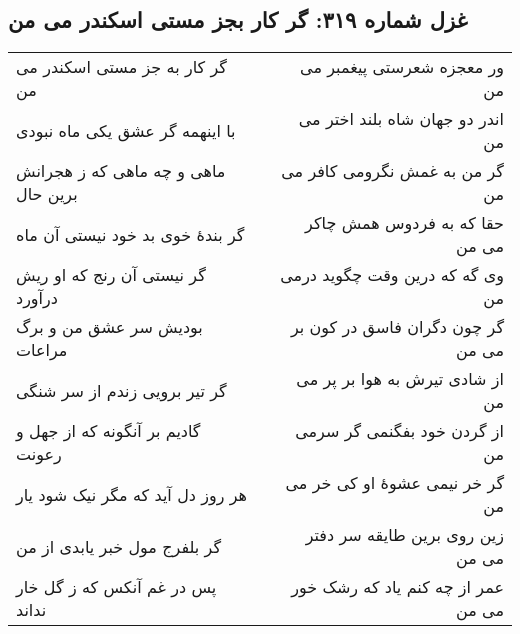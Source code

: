 \begin{center}
\section*{غزل شماره ۳۱۹: گر کار بجز مستی اسکندر می من}
\label{sec:319}
\begin{longtable}{l p{0.5cm} r}
گر کار به جز مستی اسکندر می من
&&
ور معجزه شعرستی پیغمبر می من
\\
با اینهمه گر عشق یکی ماه نبودی
&&
اندر دو جهان شاه بلند اختر می من
\\
ماهی و چه ماهی که ز هجرانش برین حال
&&
گر من به غمش نگرومی کافر می من
\\
گر بندهٔ خوی بد خود نیستی آن ماه
&&
حقا که به فردوس همش چاکر می من
\\
گر نیستی آن رنج که او ریش درآورد
&&
وی گه که درین وقت چگوید درمی من
\\
بودیش سر عشق من و برگ مراعات
&&
گر چون دگران فاسق در کون بر می من
\\
گر تیر برویی زندم از سر شنگی
&&
از شادی تیرش به هوا بر پر می من
\\
گادیم بر آنگونه که از جهل و رعونت
&&
از گردن خود بفگنمی گر سرمی من
\\
هر روز دل آید که مگر نیک شود یار
&&
گر خر نیمی عشوهٔ او کی خر می من
\\
گر بلفرج مول خبر یابدی از من
&&
زین روی برین طایقه سر دفتر می من
\\
پس در غم آنکس که ز گل خار نداند
&&
عمر از چه کنم یاد که رشک خور می من
\\
\end{longtable}
\end{center}
